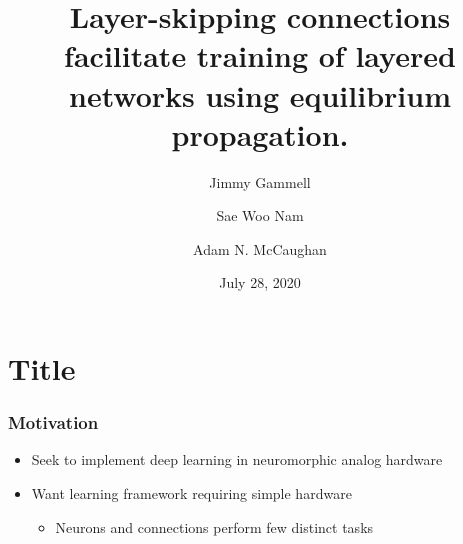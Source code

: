\documentclass[pdf]{beamer}
\title{Layer-skipping connections facilitate training of layered networks using equilibrium propagation.}
\author{Jimmy Gammell \and Sae Woo Nam \and Adam N. McCaughan}
\date{July 28, 2020}
\begin{document}
\section{Title} %
\begin{frame} %
	\titlepage
\end{frame}

\begin{frame}
\frametitle{Motivation}
\begin{itemize}
	\item<1-> Seek to implement deep learning in neuromorphic analog hardware
	\item<2-> Want learning framework requiring simple hardware
	\begin{itemize}
		\item<3-> Neurons and connections perform few distinct tasks
	\end{itemize}
\end{itemize}
\end{frame}
\end{document}
